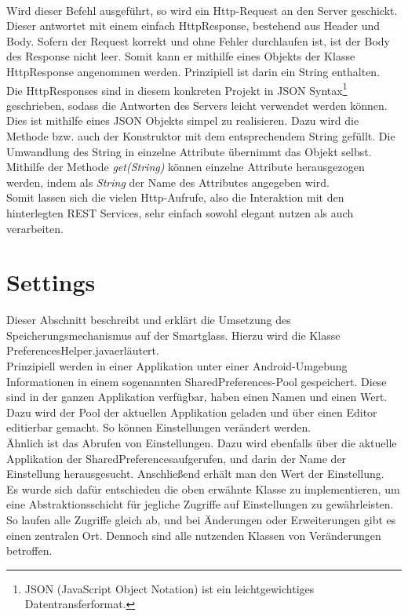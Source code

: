 \\
Wird dieser Befehl ausgeführt, so wird ein Http-Request an den Server geschickt. Dieser antwortet mit einem einfach HttpResponse, bestehend aus Header und Body. Sofern der Request korrekt und ohne Fehler durchlaufen ist, ist der Body des Response nicht leer. Somit kann er mithilfe eines Objekts der Klasse HttpResponse angenommen werden. Prinzipiell ist darin ein String enthalten. 
\\
Die HttpResponses sind in diesem konkreten Projekt in JSON Syntax\footnote{JSON (JavaScript Object Notation) ist ein leichtgewichtiges Datentransferformat.} geschrieben, sodass die Antworten des Servers leicht verwendet werden können. Dies ist mithilfe eines JSON Objekts simpel zu realisieren. Dazu wird die Methode bzw. auch der Konstruktor mit dem entsprechendem String gefüllt. Die Umwandlung des String in einzelne Attribute übernimmt das Objekt selbst. Mithilfe der Methode \textit{get(String)} können einzelne Attribute herausgezogen werden, indem als  \textit{String} der Name des Attributes angegeben wird.
\\
Somit lassen sich die vielen Http-Aufrufe, also die Interaktion mit den hinterlegten REST Services, sehr einfach sowohl elegant nutzen als auch verarbeiten.

\section{Settings}
\label{sec:settings}
Dieser Abschnitt beschreibt und erklärt die Umsetzung des Speicherungsmechanismus auf der Smartglass. Hierzu wird die Klasse \glqq PreferencesHelper.java\grqq erläutert. 
\\
Prinzipiell werden in einer Applikation unter einer Android-Umgebung Informationen in einem sogenannten SharedPreferences-Pool gespeichert. Diese sind in der ganzen Applikation verfügbar, haben einen Namen und einen Wert. Dazu wird der Pool der aktuellen Applikation geladen und über einen Editor editierbar gemacht. So können Einstellungen verändert werden. 
\\
Ähnlich ist das Abrufen von Einstellungen. Dazu wird ebenfalls über die aktuelle Applikation  der \glqq SharedPreferences\grqq aufgerufen, und darin der Name der Einstellung herausgesucht. Anschließend erhält man den Wert der Einstellung. 
\\
Es wurde sich dafür entschieden die oben erwähnte Klasse zu implementieren, um eine Abstraktionsschicht für jegliche Zugriffe auf Einstellungen zu gewährleisten. So laufen alle Zugriffe gleich ab, und bei Änderungen oder Erweiterungen gibt es einen zentralen Ort. Dennoch sind alle nutzenden Klassen von Veränderungen betroffen. 


